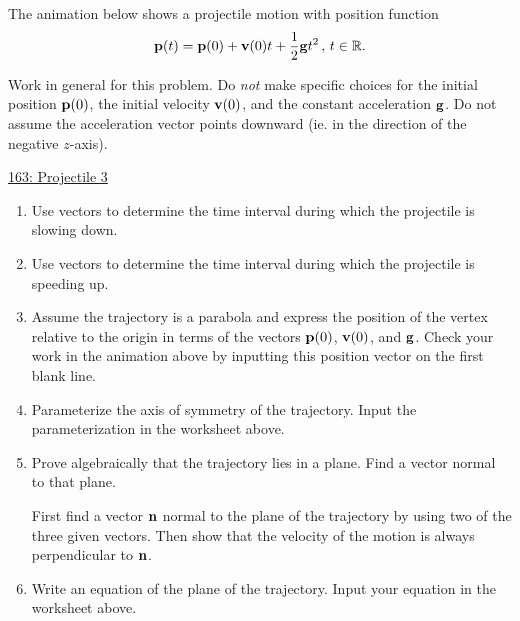 \documentclass{ximera}
\begin{document}
\begin{question}  \label{Q454rft4t4t}
The animation below shows a projectile motion with position function
\[
    {\bf p}(t) = {\bf p}(0) + {\bf v}(0)t + \frac{1}{2}{\bf g}t^2 \, , \, t \in \mathbb{R} .
\]

Work in general for this problem. Do \emph{not} make specific choices for the initial position ${\bf p}(0)$, the initial velocity ${\bf v}(0)$, and the constant acceleration ${\bf g}$. Do not assume the acceleration vector points downward (ie. in the direction of the negative $z$-axis).

\begin{onlineOnly}
    \begin{center}
\end{center}
\end{onlineOnly}

\href{https://www.desmos.com/3d/clr4mdmltt}{163: Projectile 3}

\begin{enumerate}
\item Use vectors to determine the time interval during which the projectile is slowing down. 

\item Use vectors to determine the time interval during which the projectile is speeding up. 

\item Assume the trajectory is a parabola and express the position of the vertex relative to the origin in terms of the vectors ${\bf p}(0)$, ${\bf v}(0)$, and ${\bf g}$. Check  your work in the animation above by inputting this position vector on the first blank line.

\item Parameterize the axis of symmetry of the trajectory. Input the parameterization in the worksheet above.

\item Prove algebraically that the trajectory lies in a plane. Find a vector normal to that plane.

\begin{hint}
First find a vector ${\bf n}$ normal to the plane of the trajectory by using two of the three given vectors. Then show that the velocity of the motion is always perpendicular to ${\bf n}$.
\end{hint}


\item Write an equation of the plane of the trajectory. Input your equation in the worksheet above.

\end{enumerate}
\end{question}
\end{document}
